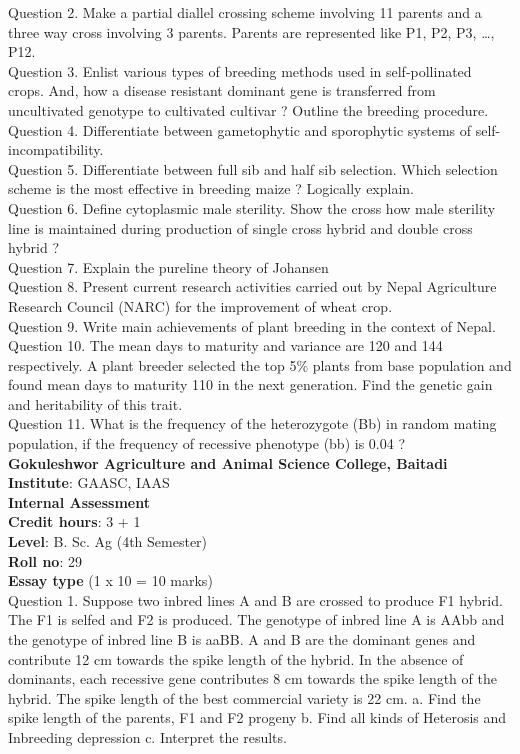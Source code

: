 \documentclass[12pt]{article}\usepackage[]{graphicx}\usepackage[]{color}
\begin{document}
Question 2. Make a partial diallel crossing scheme involving 11 parents and a three way cross involving 3 parents. Parents are represented like P1, P2, P3, …, P12.\\
Question 3. Enlist various types of breeding methods used in self-pollinated crops. And, how a disease resistant dominant gene is transferred from uncultivated genotype to cultivated cultivar ? Outline the breeding procedure.\\
Question 4. Differentiate between gametophytic and sporophytic systems of self-incompatibility.\\
Question 5. Differentiate between full sib and half sib selection. Which selection scheme is the most effective in breeding maize ? Logically explain.\\
Question 6. Define cytoplasmic male sterility. Show the cross how male sterility line is maintained during production of single cross hybrid and double cross hybrid ?\\
Question 7. Explain the pureline theory of Johansen\\
Question 8. Present current research activities carried out by Nepal Agriculture Research Council (NARC) for the improvement of wheat crop.\\
Question 9. Write main achievements of plant breeding in the context of Nepal.\\
Question 10. The mean days to maturity and variance are 120 and 144 respectively. A plant breeder selected the top 5\% plants from base population and found mean days to maturity 110 in the next generation. Find the genetic gain and heritability of this trait.\\
Question 11. What is the frequency of the heterozygote (Bb) in random mating population, if the frequency of recessive phenotype (bb) is 0.04 ?\\
\clearpage 
{\centering \Large{\textbf{Gokuleshwor Agriculture and Animal Science College, Baitadi}} \\[0.25cm]
            \textbf{Institute}: GAASC, IAAS \\[0.2cm]
            \textbf{Internal Assessment} \\[0.2cm]} 
\textbf{Credit hours}: 3 + 1 \\ 
\textbf{Level}: B. Sc. Ag (4th Semester) \\
\textbf{Roll no}: 29 \\[0.5cm] 
\textbf{Essay type} (1 x 10 = 10 marks) \\
Question 1. Suppose two inbred lines A and B are crossed to produce F1 hybrid. The F1 is selfed and F2 is produced. The genotype of inbred line A is AAbb and the genotype of inbred line B is aaBB. A and B are the dominant genes and contribute 12 cm towards the spike length of the hybrid. In the absence of dominants, each recessive gene contributes 8 cm towards the spike length of the hybrid. The spike length of the best commercial variety is 22 cm. a. Find the spike length of the parents, F1 and F2 progeny b. Find all kinds of Heterosis and Inbreeding depression c. Interpret the results.\\
\end{document}
